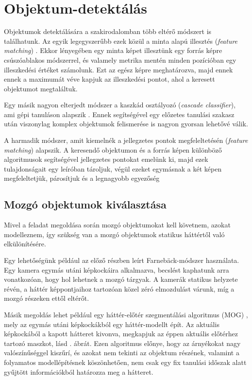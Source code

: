 \section{Objektum-detektálás \label{sec:obj_detection}}

Objektumok detektálására a szakirodalomban több eltérő módszert is találhatunk. Az egyik legegyszerűbb ezek közül a minta alapú illesztés (\textit{feature matching}) \cite{brunelli1997template}. Ekkor lényegében egy minta képet illesztünk egy forrás képre csúszóablakos módszerrel, és valamely metrika mentén minden pozícióban egy illeszkedési értéket számolunk. Ezt az egész képre meghatározva, majd ennek ennek a maximumát véve kapjuk az illeszkedési pontot, ahol a keresett objektumot megtaláltuk.

Egy másik nagyon elterjedt módszer a kaszkád osztályozó (\textit{cascade classifier}), ami gépi tanuláson alapszik \cite{viola2001rapid}. Ennek segítségével egy előzetes tanulási szakasz után viszonylag komplex objektumok felismerése is nagyon gyorsan lehetővé válik.

A harmadik módszer, amit kiemelnék a jellegzetes pontok megfeleltetésén (\textit{feature matching}) alapszik. A keresendő objektumon és a forrás képen különböző algoritmusok segítségével jellegzetes pontokat emelünk ki, majd ezek tulajdonságait egy leíróban tároljuk, végül ezeket egymásnak a két képen megfeleltetjük, párosítjuk és a legnagyobb egyezőség

\subsection{Mozgó objektumok kiválasztása}

Mivel a feladat megoldása során mozgó objektumokat kell követnem, azokat modelleznem, így szükség van a mozgó objektumok statikus háttértől való elkülönítésére.

Egy lehetőségünk például az előző részben leírt Farnebäck-módszer használata. Egy kamera egymás utáni képkockáira alkalmazva, becslést kaphatunk arra vonatkozóan, hogy hol lehetnek a mozgó tárgyak. A kamerák statikus helyzete révén, a háttér képpontjaihoz tartozóan közel zéró elmozdulást várunk, míg a mozgó részeken ettől eltérőt.

Másik megoldás lehet például egy háttér-előtér szegmentálási algoritmus (MOG) \cite{MOG}, mely az egymás utáni képkockákból egy háttér-modellt épít. Az aktuális képkockából a kapott hátteret kivonva, megkapjuk az éppen aktuális előtérhez tartozó maszkot, lásd . ábrát. Ezen algoritmus előnye, hogy az árnyékokat nagy valószínűséggel kiszűrí, és azokat nem tekinti az objektum részének, valamint a folyamatos modellépítésnek köszönhetően, nem csak egy fix tanulási időszak alatt gyűjtött információkból határozza meg a hátteret.

